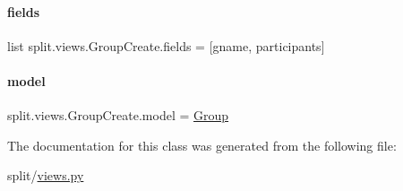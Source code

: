 \paragraph{\texorpdfstring{fields}{fields}}
{\footnotesize\ttfamily list split.\+views.\+Group\+Create.\+fields = \mbox{[}\textquotesingle{}gname\textquotesingle{}, \textquotesingle{}participants\textquotesingle{}\mbox{]}\hspace{0.3cm}{\ttfamily [static]}}

\mbox{\label{classsplit_1_1views_1_1GroupCreate_a92b8d00f9894e5ae0122a8d14430573d}} 
\paragraph{\texorpdfstring{model}{model}}
{\footnotesize\ttfamily split.\+views.\+Group\+Create.\+model = \hyperlink{classsplit_1_1models_1_1Group}{Group}\hspace{0.3cm}{\ttfamily [static]}}



The documentation for this class was generated from the following file\+:\begin{DoxyCompactItemize}
\item 
split/\hyperlink{split_2views_8py}{views.\+py}\end{DoxyCompactItemize}
